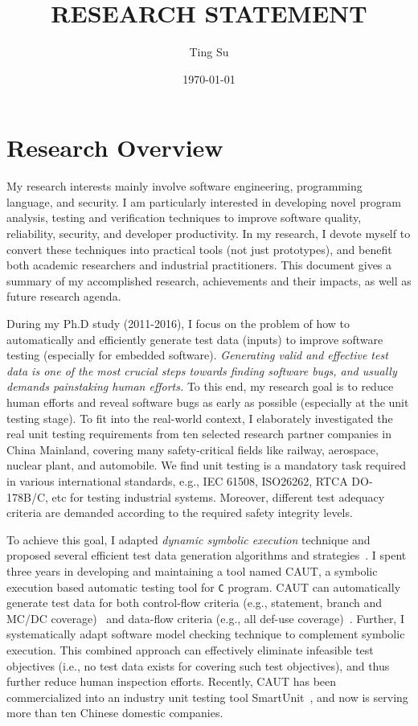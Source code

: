 \documentclass[a4paper]{article}
\title{RESEARCH STATEMENT}
\author{Ting Su}
\date{\today}
\begin{document}
\fontsize{12}{15}
\selectfont
\maketitle

\section{Research Overview}

My research interests mainly involve software engineering, programming language, and security. I am particularly interested in developing novel program analysis, testing and verification techniques to improve software quality, reliability, security, and developer productivity. In my research, I devote myself to convert these techniques into practical tools (not just prototypes), and benefit both academic researchers and industrial practitioners. This document gives a summary of my accomplished
research, achievements and their impacts, as well as future research agenda.

During my Ph.D study (2011-2016), I focus on the problem of how to automatically and efficiently generate test data (inputs) to improve software testing (especially for embedded software). \emph{Generating valid and effective test data is one of the most crucial steps towards finding software bugs, and usually demands painstaking human efforts.}
To this end, my research goal is to reduce human efforts and reveal software bugs as early as possible (especially at the unit testing stage). 
To fit into the real-world context, I elaborately investigated the real unit testing requirements from ten selected research partner companies in China Mainland, covering many safety-critical fields like railway, aerospace, nuclear plant, and automobile.
We find unit testing is a mandatory task required in various international standards, e.g., IEC 61508, ISO26262, RTCA DO-178B/C, etc for testing industrial systems. Moreover, different test adequacy criteria are demanded according to the required safety integrity levels.

To achieve this goal, I adapted \emph{dynamic symbolic execution} technique and proposed several efficient test data generation algorithms and strategies~\cite{sere14,icse15,csur17,scis16,smartunit}.
I spent three years in developing and maintaining a tool named CAUT, a symbolic execution based automatic testing tool for \texttt{C} program. CAUT can automatically generate test data for both control-flow criteria (e.g., statement, branch and MC/DC coverage)~\cite{sere14} and data-flow criteria (e.g., all def-use coverage)~\cite{icse15,csur17}.
Further, I systematically adapt software model checking technique to complement symbolic execution. This combined approach can effectively eliminate infeasible test objectives (i.e., no test data exists for covering such test objectives), and thus further reduce human inspection efforts. Recently, CAUT has been commercialized into an industry unit testing tool SmartUnit~\cite{smartunit}, and now is serving more than ten Chinese domestic companies.
\end{document}
